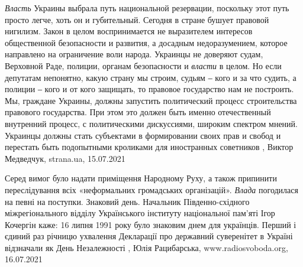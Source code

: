\emph{Власть} Украины выбрала путь национальной резервации, поскольку этот путь просто
легче, хоть он и губительный. Сегодня в стране бушует правовой нигилизм. Закон
в целом воспринимается не выразителем интересов общественной безопасности и
развития, а досадным недоразумением, которое направлено на ограничение воли
народа. Украинцы не доверяют судам, Верховной Раде, полиции, органам
безопасности и \emph{власти} в целом.  Но если депутатам непонятно, какую страну мы
строим, судьям ‒ кого и за что судить, а полиции ‒ кого и от кого защищать, то
правовое государство нам не построить. Мы, граждане Украины, должны запустить
политический процесс строительства правового государства. При этом это должен
быть именно отечественный внутренний процесс, с политическими дискуссиями,
широким спектром мнений. Украинцы должны стать субъектами в формировании своих
прав и свобод и перестать быть подопытными кроликами для иностранных советников
, 
Виктор Медведчук, strana.ua, 15.07.2021

Серед вимог було надати приміщення Народному Руху, а також припинити
переслідування всіх «неформальних громадських організацій». \emph{Влада}
погодилася на певні на поступки.  Знаковий день.  Начальник Південно-східного
міжрегіонального відділу Українського інституту національної пам'яті Ігор
Кочергін каже: 16 липня 1991 року було знаковим днем для українців. Перший і
єдиний раз річницю ухвалення Декларації про державний суверенітет в Україні
відзначали як День Незалежності
, 
Юлія Рацибарська, www.radiosvoboda.org, 16.07.2021

